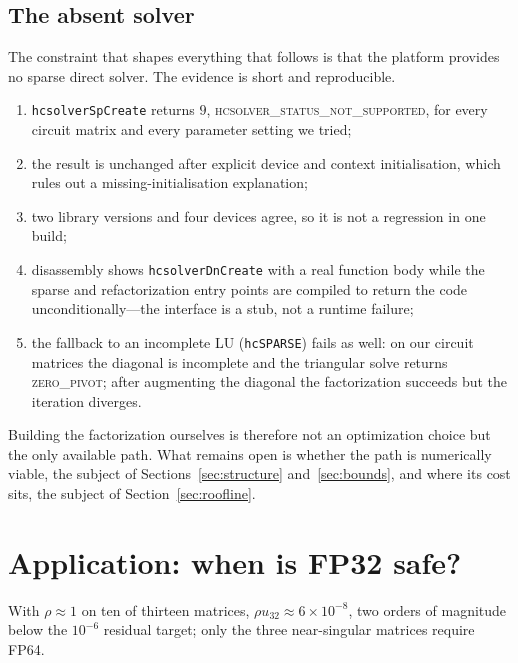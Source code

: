 \documentclass[11pt]{article}
\theoremstyle{remark}
\begin{document}








\subsection{The absent solver}\label{sec:absent}

The constraint that shapes everything that follows is that the platform provides
no sparse direct solver. The evidence is short and reproducible.

\begin{enumerate}
  \item \texttt{hcsolverSpCreate} returns $9$,
        \textsc{hcsolver\_status\_not\_supported}, for every circuit matrix and
        every parameter setting we tried;
  \item the result is unchanged after explicit device and context initialisation,
        which rules out a missing-initialisation explanation;
  \item two library versions and four devices agree, so it is not a regression in
        one build;
  \item disassembly shows \texttt{hcsolverDnCreate} with a real function body
        while the sparse and refactorization entry points are compiled to return
        the code unconditionally---the interface is a stub, not a runtime failure;
  \item the fallback to an incomplete LU (\texttt{hcSPARSE}) fails as well: on our
        circuit matrices the diagonal is incomplete and the triangular solve
        returns \textsc{zero\_pivot}; after augmenting the diagonal the
        factorization succeeds but the iteration diverges.
\end{enumerate}

Building the factorization ourselves is therefore not an optimization choice but
the only available path. What remains open is whether the path is numerically
viable, the subject of Sections~\ref{sec:structure} and~\ref{sec:bounds}, and
where its cost sits, the subject of Section~\ref{sec:roofline}.

\section{Application: when is FP32 safe?}

With $\rho\approx1$ on ten of thirteen matrices, $\rho u_{32}\approx6\times10^{-8}$,
two orders of magnitude below the $10^{-6}$ residual target; only the three
near-singular matrices require FP64.
\end{document}
